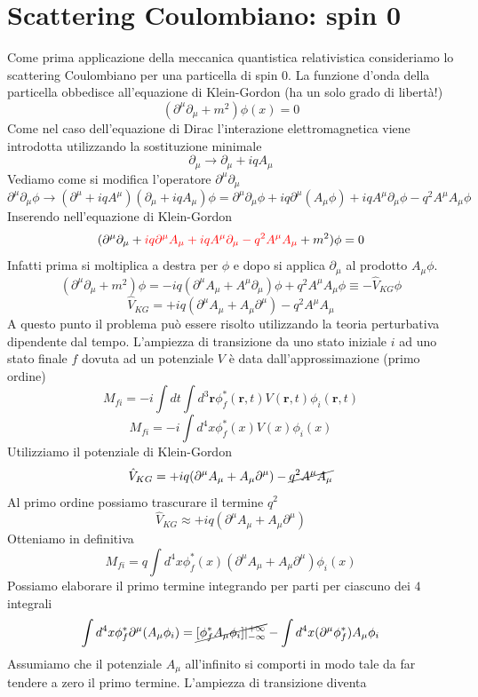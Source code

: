 \section{Scattering Coulombiano: spin 0}
Come prima applicazione della meccanica quantistica relativistica consideriamo lo scattering Coulombiano per una particella di spin 0. La funzione d'onda della particella obbedisce all'equazione di Klein-Gordon (ha un solo grado di libertà!)
$$
(\partial^\mu \partial_\mu + m^2)\phi(x) = 0
$$
Come nel caso dell'equazione di Dirac l'interazione elettromagnetica viene introdotta utilizzando la sostituzione minimale
$$
\partial_\mu \to \partial_\mu + iqA_\mu
$$
Vediamo come si modifica l'operatore $\partial^\mu\partial_\mu$
$$
\partial^\mu \partial_\mu \phi \to (\partial^\mu + iqA^\mu)(\partial_\mu + iqA_\mu)\phi = \partial^\mu \partial_\mu \phi + iq\partial^\mu(A_\mu\phi) + iqA^\mu \partial_\mu \phi - q^2 A^\mu A_\mu \phi
$$
Inserendo nell'equazione di Klein-Gordon
$$
(\partial^\mu \partial_\mu +\textcolor{red}{ iq\partial^\mu A_\mu + iqA^\mu \partial_\mu - q^2 A^\mu A_\mu} + m^2)\phi = 0
$$
Infatti prima si moltiplica a destra per $\phi$ e dopo si applica $\partial_\mu$ al prodotto $A_\mu\phi$.
$$
(\partial^\mu \partial_\mu + m^2)\phi = -iq(\partial^\mu A_\mu + A^\mu \partial_\mu)\phi + q^2 A^\mu A_\mu \phi \equiv -\hat{V}_{KG}\phi
$$
$$
\hat{V}_{KG} = +iq(\partial^\mu A_\mu + A_\mu \partial^\mu) - q^2 A^\mu A_\mu
$$
A questo punto il problema può essere risolto utilizzando la teoria perturbativa dipendente dal tempo. L'ampiezza di transizione da uno stato iniziale $i$ ad uno stato finale $f$ dovuta ad un potenziale $V$ è data dall'approssimazione (primo ordine)
$$
M_{fi} = -i \int dt \int d^3\mathbf{r} \phi_f^*(\mathbf{r}, t) V(\mathbf{r}, t) \phi_i(\mathbf{r}, t)
$$
$$
M_{fi} = -i \int d^4x \phi_f^*(x) V(x) \phi_i(x)
$$
Utilizziamo il potenziale di Klein-Gordon
$$
\hat{V}_{KG} = +iq(\partial^\mu A_\mu + A_\mu \partial^\mu) - \cancel{q^2 A^\mu A_\mu}
$$
Al primo ordine possiamo trascurare il termine $q^2$
$$
\hat{V}_{KG} \approx +iq(\partial^\mu A_\mu + A_\mu \partial^\mu)
$$
Otteniamo in definitiva
$$
M_{fi} = q \int d^4x \phi_f^*(x) (\partial^\mu A_\mu + A_\mu \partial^\mu) \phi_i(x)
$$
Possiamo elaborare il primo termine integrando per parti per ciascuno dei $4$ integrali
$$
\int d^4x \phi_f^* \partial^\mu (A_\mu \phi_i) = \cancel{[\phi_f^* A_\mu \phi_i]|_{-\infty}^{+\infty}} - \int d^4x (\partial^\mu \phi_f^*) A_\mu \phi_i
$$
Assumiamo che il potenziale $A_\mu$ all'infinito si comporti in modo tale da far tendere a zero il primo termine. L'ampiezza di transizione diventa

